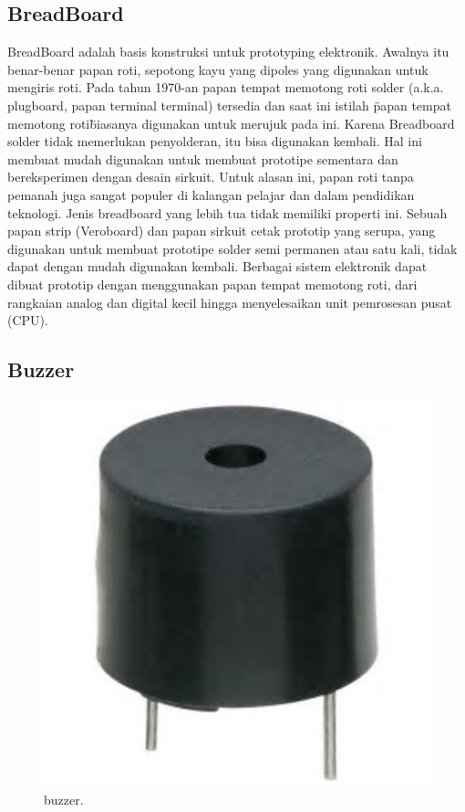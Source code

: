 \subsection{BreadBoard}
BreadBoard adalah basis konstruksi untuk prototyping elektronik. Awalnya itu benar-benar papan roti, sepotong kayu yang dipoles yang digunakan untuk mengiris roti. Pada tahun 1970-an papan tempat memotong roti solder (a.k.a. plugboard, papan terminal terminal) tersedia dan saat ini istilah \"papan tempat memotong roti\" biasanya digunakan untuk merujuk pada ini.
Karena Breadboard solder tidak memerlukan penyolderan, itu bisa digunakan kembali. Hal ini membuat mudah digunakan untuk membuat prototipe sementara dan bereksperimen dengan desain sirkuit. Untuk alasan ini, papan roti tanpa pemanah juga sangat populer di kalangan pelajar dan dalam pendidikan teknologi. Jenis breadboard yang lebih tua tidak memiliki properti ini. Sebuah papan strip (Veroboard) dan papan sirkuit cetak prototip yang serupa, yang digunakan untuk membuat prototipe solder semi permanen atau satu kali, tidak dapat dengan mudah digunakan kembali. Berbagai sistem elektronik dapat dibuat prototip dengan menggunakan papan tempat memotong roti, dari rangkaian analog dan digital kecil hingga menyelesaikan unit pemrosesan pusat (CPU).

\subsection{Buzzer}

\begin{figure}[ht]
	\centerline{\includegraphics[width=1\textwidth]{figures/buzzer.JPG}}
	\caption{buzzer.}
	\label{buzzer}
\end{figure}
	
